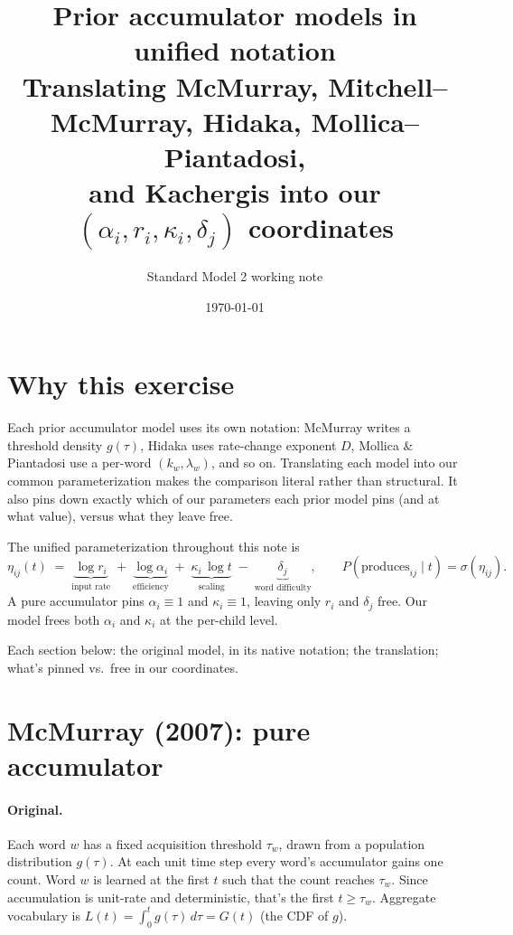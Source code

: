 \documentclass[11pt]{article}
\title{Prior accumulator models in unified notation\\
\large{Translating McMurray, Mitchell--McMurray, Hidaka, Mollica--Piantadosi,\\
       and Kachergis into our $(\alpha_i, r_i, \kappa_i, \delta_j)$ coordinates}}
\author{Standard Model 2 working note}
\date{\today}
\begin{document}
\maketitle

\section{Why this exercise}

Each prior accumulator model uses its own notation: McMurray writes a
threshold density $g(\tau)$, Hidaka uses rate-change exponent $D$,
Mollica \& Piantadosi use a per-word $(k_w, \lambda_w)$, and so on.
Translating each model into our common parameterization makes the
comparison literal rather than structural. It also pins down exactly
which of our parameters each prior model pins (and at what value),
versus what they leave free.

The unified parameterization throughout this note is
\begin{equation}
\eta_{ij}(t) \;=\;
\underbrace{\log r_i}_{\text{input rate}}
\;+\;
\underbrace{\log\alpha_i}_{\text{efficiency}}
\;+\;
\underbrace{\kappa_i\,\log t}_{\text{scaling}}
\;-\;
\underbrace{\delta_j}_{\text{word difficulty}},
\qquad
P(\text{produces}_{ij}\mid t) = \sigma(\eta_{ij}).
\label{eq:our-model}
\end{equation}
A pure accumulator pins $\alpha_i \equiv 1$ and $\kappa_i \equiv 1$,
leaving only $r_i$ and $\delta_j$ free. Our model frees both
$\alpha_i$ and $\kappa_i$ at the per-child level.

Each section below: the original model, in its native notation; the
translation; what's pinned vs.\ free in our coordinates.

\section{McMurray (2007): pure accumulator}

\paragraph{Original.}
Each word $w$ has a fixed acquisition threshold $\tau_w$, drawn from
a population distribution $g(\tau)$. At each unit time step every
word's accumulator gains one count. Word $w$ is learned at the first
$t$ such that the count reaches $\tau_w$. Since accumulation is
unit-rate and deterministic, that's the first $t \ge \tau_w$.
Aggregate vocabulary is $L(t) = \int_0^t g(\tau)\,d\tau = G(t)$
(the CDF of $g$).
\end{document}
